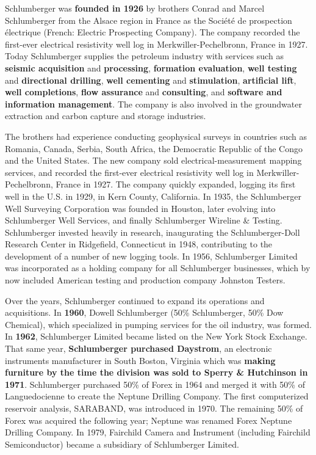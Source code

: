 \documentclass[12pt,a4paper]{report}
\begin{document}
Schlumberger was \textbf{founded in 1926} by brothers Conrad and Marcel
Schlumberger from the Alsace region in France as the Soci\'et\'e de
prospection \'electrique (French: Electric Prospecting Company). The company
recorded the first-ever electrical resistivity well log in
Merkwiller-Pechelbronn, France in 1927. Today Schlumberger supplies the
petroleum industry with services such as \textbf{seismic acquisition} and
\textbf{processing}, \textbf{formation evaluation}, \textbf{well testing}
and \textbf{directional drilling}, \textbf{well cementing} and
\textbf{stimulation}, \textbf{artificial lift}, \textbf{well completions},
\textbf{flow assurance} and \textbf{consulting}, and \textbf{software and
  information management}. The company is also involved in the groundwater
extraction and carbon capture and storage industries.

The brothers had experience conducting geophysical surveys in countries such
as Romania, Canada, Serbia, South Africa, the Democratic Republic of the
Congo and the United States. The new company sold electrical-measurement
mapping services, and recorded the first-ever electrical resistivity well
log in Merkwiller-Pechelbronn, France in 1927. The company quickly expanded,
logging its first well in the U.S. in 1929, in Kern County, California. In
1935, the Schlumberger Well Surveying Corporation was founded in Houston,
later evolving into Schlumberger Well Services, and finally Schlumberger
Wireline \& Testing. Schlumberger invested heavily in research, inaugurating
the Schlumberger-Doll Research Center in Ridgefield, Connecticut in 1948,
contributing to the development of a number of new logging tools. In 1956,
Schlumberger Limited was incorporated as a holding company for all
Schlumberger businesses, which by now included American testing and
production company Johnston Testers.

Over the years, Schlumberger continued to expand its operations and
acquisitions. In \textbf{1960}, Dowell Schlumberger (50\% Schlumberger, 50\%
Dow Chemical), which specialized in pumping services for the oil industry,
was formed. In \textbf{1962}, Schlumberger Limited became listed on the New
York Stock Exchange. That same year, \textbf{Schlumberger purchased
  Daystrom}, an electronic instruments manufacturer in South Boston,
Virginia which was \textbf{making furniture by the time the division was
  sold to Sperry \& Hutchinson in 1971}. Schlumberger purchased 50\% of
Forex in 1964 and merged it with 50\% of Languedocienne to create the
Neptune Drilling Company. The first computerized reservoir analysis,
SARABAND, was introduced in 1970. The remaining 50\% of Forex was acquired
the following year; Neptune was renamed Forex Neptune Drilling Company. In
1979, Fairchild Camera and Instrument (including Fairchild Semiconductor)
became a subsidiary of Schlumberger Limited.
\end{document}
